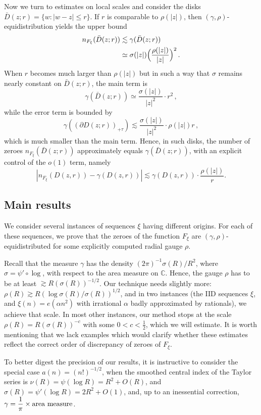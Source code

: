 \documentclass[11pt]{amsart}
\numberwithin{equation}{section}
\newcommand{\bC}{\mathbb C}
\begin{document}
Now we turn to estimates on local scales and consider the disks
$\bar D(z; r) = \{w\colon |w-z|\le r\}$.
If $r$ is comparable to $\rho (|z|)$, then
$(\gamma, \rho)$-equidistribution yields the upper bound
\begin{align*}
n_{F_\xi}(\bar D(z; r)) &\lesssim \gamma (\bar D(z; r)) \\
&\simeq \sigma (|z|)\Bigl( \frac{\rho(|z|)}{|z|} \Bigl)^2\,.
\end{align*}
When $r$ becomes much larger than $\rho (|z|)$ but in such a way that
$\sigma$ remains nearly constant on $\bar D(z; r)$, the main term is
\[
\gamma(\bar D(z; r)) \simeq \frac{\sigma (|z|)}{|z|^2}\cdot r^2\,,
\]
while the error term is bounded by
\[
\gamma ((\partial D(z; r))_{+\tau}) \lesssim \frac{\sigma (|z|)}{|z|^2}\cdot \rho (|z|)r\,,
\]
which is much smaller than the main term. Hence, in such disks, the number of zeroes
$n_{F_\xi}(\bar D(z; r))$ approximately equals $\gamma (\bar D(z; r))$,
with an explicit control of the $o(1)$ term, namely 
$$
|n_{F_\xi} (D(z, r)) - \gamma (D(z, r)) | \lesssim \gamma (D(z, r)) \cdot \frac{\rho(|z|)}{r}.
$$



\subsection{Main results}
We consider several instances of sequences $\xi$ having different origins.
For each of these sequences, we prove that the zeroes of the function $F_\xi$ are
$(\gamma, \rho)$-equidistributed for some explicitly computed radial gauge $\rho$.

Recall that the measure $\gamma$ has the density $(2\pi)^{-1}\sigma(R)/R^2$, where $\sigma = \psi' \circ \log$,
with respect to the area measure on $\bC$. Hence, the gauge $\rho$ has to be at least
$\gtrsim R(\sigma (R))^{-1/2}$. Our technique needs slightly more:
$\rho (R) \gtrsim R (\log\sigma (R)/\sigma (R))^{1/2}$,
and in two instances (the IID sequences $\xi$, and $\xi (n) = e(\alpha n^2)$ with irrational $\alpha$ badly approximated by rationals), we achieve that scale. In most other instances, our method stops
at the scale $\rho (R) = R (\sigma (R))^{-c}$ with some $0<c<\tfrac12$, which we will estimate.
It is worth mentioning that we lack examples which would clarify whether these estimates
reflect the correct order of discrepancy of zeroes of $F_\xi$.

To better digest the precision of our results, it
is instructive to consider the special
case $a(n) = (n!)^{-1/2}$, when the smoothed central index of the Taylor series
is $\nu (R) = \psi(\log R) = R^2 + O(R)$, and
$\sigma (R) = \psi' (\log R) = 2R^2 +O(1)$, and, up to an inessential correction,
$ \gamma = \displaystyle \frac1{\pi} \times {\rm area\ measure}$.
\end{document}
